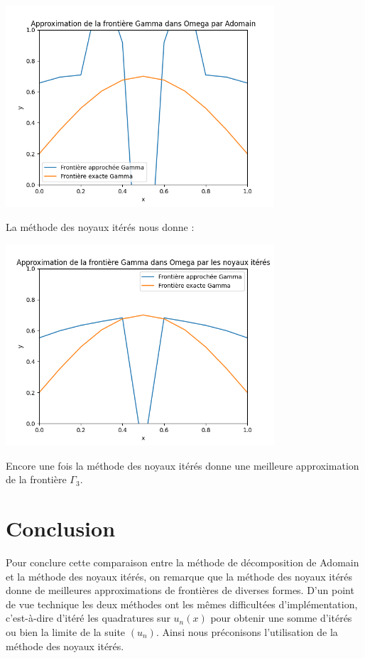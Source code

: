 \documentclass{article}
\begin{document}
    {
\includegraphics[width=10cm]{frontiere_sinus_adomain.png} \par}
\bigskip

La méthode des noyaux itérés nous donne :

    {
\includegraphics[width=10cm]{frontiere_sinus_noyaux.png} \par}
\bigskip

Encore une fois la méthode des noyaux itérés donne une meilleure approximation de la frontière $\Gamma_3$.

\section{Conclusion}
Pour conclure cette comparaison entre la méthode de décomposition de Adomain et la méthode des noyaux itérés, on remarque que la méthode des noyaux itérés donne de meilleures approximations de frontières de diverses formes. D'un point de vue technique les deux méthodes ont les mêmes difficultées d'implémentation, c'est-à-dire d'itéré les quadratures sur $u_n(x)$ pour obtenir une somme d'itérés ou bien la limite de la suite $(u_n)$. Ainsi nous préconisons l'utilisation de la méthode des noyaux itérés.
\end{document}
